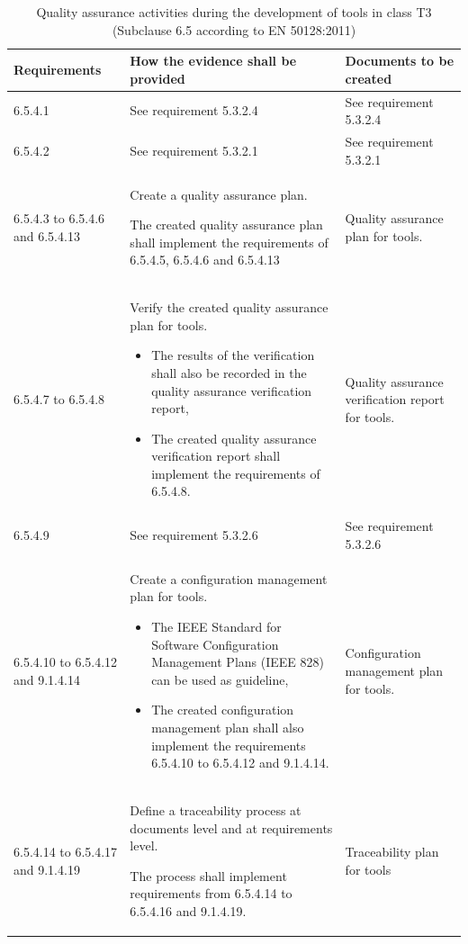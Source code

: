 \documentclass{template/openetcs_report}
\begin{document}
{\footnotesize\sffamily\centering
\begin{longtable}{|p{2cm}|p{9cm}|p{3cm}|}
\caption{Quality assurance activities during the development of tools in class T3 (Subclause 6.5 according to EN 50128:2011)}\\
\hline
\bfseries Requirements & \bfseries How the evidence shall be provided & \bfseries Documents to be created\\
\hline
\hline
\endhead
\hline
\endfoot

6.5.4.1 & See requirement 5.3.2.4 & See requirement 5.3.2.4\\ 
\hline
6.5.4.2 & See requirement 5.3.2.1 & See requirement 5.3.2.1\\ 
\hline
6.5.4.3 to 6.5.4.6 and 6.5.4.13 & Create a quality assurance plan.

The created quality assurance plan shall implement the requirements of 6.5.4.5, 6.5.4.6 and 6.5.4.13
& Quality assurance plan for tools.\\ 
\hline
6.5.4.7 to 6.5.4.8 & Verify the created quality assurance plan for tools.
\begin{itemize}\itemsep=0pt
  \item The results of the verification shall also be recorded in the quality assurance verification report,
  \item The created quality assurance verification report shall implement the requirements of 6.5.4.8. 
\end{itemize}
& Quality assurance verification report for tools.\\ 
\hline
6.5.4.9 & See requirement 5.3.2.6 & See requirement 5.3.2.6\\ 
\hline
6.5.4.10 to 6.5.4.12 and 9.1.4.14 & Create a configuration management plan for tools.
\begin{itemize}\itemsep=0pt
  \item The IEEE Standard for Software Configuration Management Plans (IEEE 828) can be used as guideline,
  \item The created configuration management plan shall also implement the requirements 6.5.4.10 to 6.5.4.12 and 9.1.4.14. 
\end{itemize}
& Configuration management plan for tools.\\ 
\hline
6.5.4.14 to 6.5.4.17 and 9.1.4.19 & Define a traceability process at documents level and at requirements level.

The process shall implement requirements from 6.5.4.14 to 6.5.4.16 and 9.1.4.19.
& Traceability plan for tools\\ 
\hline
\end{longtable}}
\end{document}
